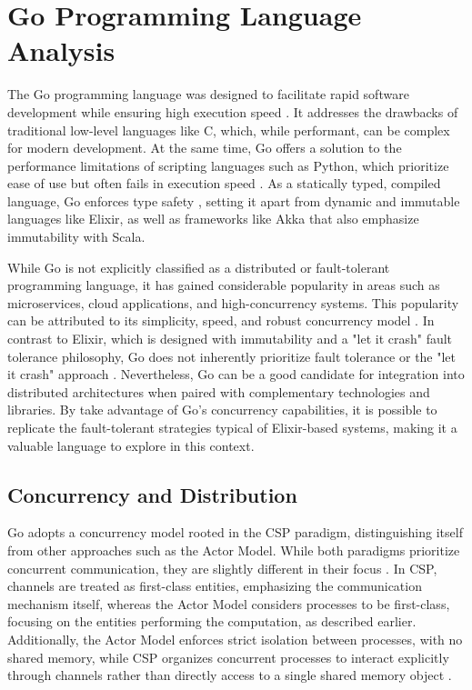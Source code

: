 \section{Go Programming Language Analysis}

The Go programming language was designed to facilitate rapid software development while ensuring high execution speed \cite{Kennedy2016, Cox-Buday2017}. It addresses the drawbacks of traditional low-level languages like C, which, while performant, can be complex for modern development. At the same time, Go offers a solution to the performance limitations of scripting languages such as Python, which prioritize ease of use but often fails in execution speed \cite{Kennedy2016}. As a statically typed, compiled language, Go enforces type safety \cite{go-docs}, setting it apart from dynamic and immutable languages like Elixir, as well as frameworks like Akka that also emphasize immutability with Scala.

While Go is not explicitly classified as a distributed or fault-tolerant programming language, it has gained considerable popularity in areas such as microservices, cloud applications, and high-concurrency systems. This popularity can be attributed to its simplicity, speed, and robust concurrency model \cite{Castro2019,Shuiskov2022}. In contrast to Elixir, which is designed with immutability and a "let it crash" fault tolerance philosophy, Go does not inherently prioritize fault tolerance or the "let it crash" approach \cite{Cox-Buday2017}. Nevertheless, Go can be a good candidate for integration into distributed architectures when paired with complementary technologies and libraries. By take advantage of Go’s concurrency capabilities, it is possible to replicate the fault-tolerant strategies typical of Elixir-based systems, making it a valuable language to explore in this context.

\subsection{Concurrency and Distribution}

Go adopts a concurrency model rooted in the \gls{CSP} paradigm, distinguishing itself from other approaches such as the Actor Model. While both paradigms prioritize concurrent communication, they are slightly different in their focus \cite{Cox-Buday2017}. In \gls{CSP}, channels are treated as first-class entities, emphasizing the communication mechanism itself, whereas the Actor Model considers processes to be first-class, focusing on the entities performing the computation, as described earlier. Additionally, the Actor Model enforces strict isolation between processes, with no shared memory, while CSP organizes concurrent processes to interact explicitly through channels rather than directly access to a single shared memory object \cite{Cox-Buday2017}.

